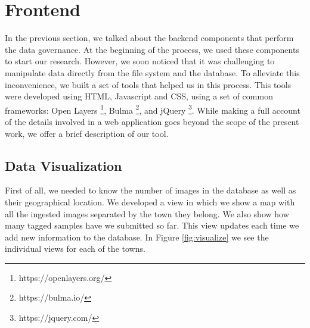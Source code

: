\section{Frontend}

In the previous section, we talked about the backend components that perform the data governance. At the beginning of the process, we used these components to start our research. However, we soon noticed that it was challenging to manipulate data directly from the file system and the database. To alleviate this inconvenience, we built a set of tools that helped us in this process. This tools were developed using HTML, Javascript and CSS, using a set of common frameworks: Open Layers \footnote{https://openlayers.org/}, Bulma \footnote{https://bulma.io/}, and jQuery \footnote{https://jquery.com/}. While making a full account of the details involved in a web application goes beyond the scope of the present work, we offer a brief description of our tool.\\

\subsection{Data Visualization}

First of all, we needed to know the number of images in the database as well as their geographical location. We developed a view in which we show a map with all the ingested images separated by the town they belong. We also show how many tagged samples have we submitted so far. This view updates each time we add new information to the database. In Figure \ref{fig:visualize} we see the individual views for each of the towns.\\


